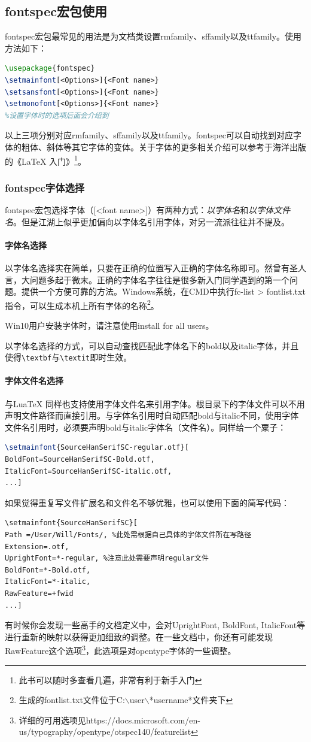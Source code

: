 \documentclass[cn,11pt,twocol,table]{elegantbook}
\begin{document}
\subsection{fontspec宏包使用}
fontspec宏包最常见的用法是为文档类设置rmfamily、sffamily以及ttfamily。使用方法如下：
\begin{lstlisting}[language=TeX]
%导言区（文档类开头）使用fontspec宏包
\usepackage{fontspec}
\setmainfont[<Options>]{<Font name>}
\setsansfont[<Options>]{<Font name>}
\setmonofont[<Options>]{<Font name>}
%设置字体时的选项后面会介绍到
\end{lstlisting}
以上三项分别对应rmfamily、sffamily以及ttfamily。fontspec可以自动找到对应字体的粗体、斜体等其它字体的变体。关于字体的更多相关介绍可以参考于海洋出版的《\LaTeX{} 入门》\footnote{此书可以随时多查看几遍，非常有利于新手入门}。
\subsubsection{fontspec字体选择}
fontspec宏包选择字体（[<font name>]）有两种方式：\emph{以字体名}和\emph{以字体文件名}。但是江湖上似乎更加偏向以字体名引用字体，对另一流派往往并不提及。\par
\paragraph{字体名选择}
以字体名选择实在简单，只要在正确的位置写入正确的字体名称即可。然曾有圣人言，大问题多起于微末。正确的字体名字往往是很多新入门同学遇到的第一个问题。提供一个方便可靠的方法。Windows系统，在CMD中执行fc-list > fontlist.txt 指令，可以生成本机上所有字体的名称\footnote{生成的fontlist.txt文件位于C:$\backslash$user$\backslash$*username*文件夹下}。\par 
Win10用户安装字体时，请注意使用install for all users。\par
以字体名选择的方式，可以自动查找匹配此字体名下的bold以及italic字体，并且使得\lstinline|\textbf|与\lstinline|\textit|即时生效。
\paragraph{字体文件名选择}
\XeTeX 与Lua\TeX{} 同样也支持使用字体文件名来引用字体。根目录下的字体文件可以不用声明文件路径而直接引用。与字体名引用时自动匹配bold与italic不同，使用字体文件名引用时，必须要声明bold与italic字体名（文件名）。同样给一个粟子：
\begin{lstlisting}[language=TeX]
\setmainfont{SourceHanSerifSC-regular.otf}[
BoldFont=SourceHanSerifSC-Bold.otf,
ItalicFont=SourceHanSerifSC-italic.otf,
...]
\end{lstlisting}
如果觉得重复写文件扩展名和文件名不够优雅，也可以使用下面的简写代码：
\begin{lstlisting}[language=Tex]
\setmainfont{SourceHanSerifSC}[
Path =/User/Will/Fonts/, %此处需根据自己具体的字体文件所在写路径
Extension=.otf,
UprightFont=*-regular, %注意此处需要声明regular文件
BoldFont=*-Bold.otf,
ItalicFont=*-italic,
RawFeature=+fwid
...]
\end{lstlisting}
有时候你会发现一些高手的文档定义中，会对UprightFont, BoldFont, ItalicFont等进行重新的映射以获得更加细致的调整。在一些文档中，你还有可能发现RawFeature这个选项\footnote{详细的可用选项见https://docs.microsoft.com/en-us/typography/opentype/otspec140/featurelist}，此选项是对opentype字体的一些调整。
\end{document}
